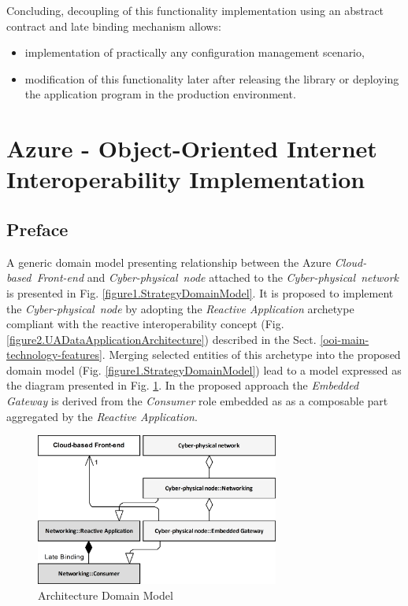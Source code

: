 \documentclass{jacsart}
\begin{document}
Concluding, decoupling of this functionality implementation using an abstract contract and late binding mechanism allows:

\begin{itemize}
      \item implementation of practically any configuration management scenario,
      \item modification of this functionality later after releasing the library or deploying the application program in the production environment.
\end{itemize}

\section{Azure - Object-Oriented Internet Interoperability Implementation}\label{sect.gateway-implementation}

\subsection{Preface}

A generic domain model presenting relationship between the Azure \textit{Cloud-based\ Front-end} and \textit{Cyber-physical\ node} attached to the \textit{Cyber-physical\ network} is presented in Fig. \ref*{figure1.StrategyDomainModel}. It is proposed to implement the \textit{Cyber-physical\ node} by adopting the \textit{Reactive Application} archetype compliant with the reactive interoperability concept (Fig. \ref*{figure2.UADataApplicationArchitecture}) described in the Sect. \ref*{ooi-main-technology-features}. Merging selected entities of this archetype into the proposed domain model (Fig. \ref*{figure1.StrategyDomainModel}) lead to a model expressed as the diagram presented in Fig. \ref*{figure3.ImplementationDomainModel}. In the proposed approach the \textit{Embedded Gateway} is derived from the \textit{Consumer} role embedded as as a composable part aggregated by the \textit{Reactive Application}.

\begin{figure}
      \centering
      \includegraphics[width=8cm]{../.Media/ImplementationDomainModel.png}
      \caption{Architecture Domain Model}\label{figure3.ImplementationDomainModel}
\end{figure}
\end{document}
